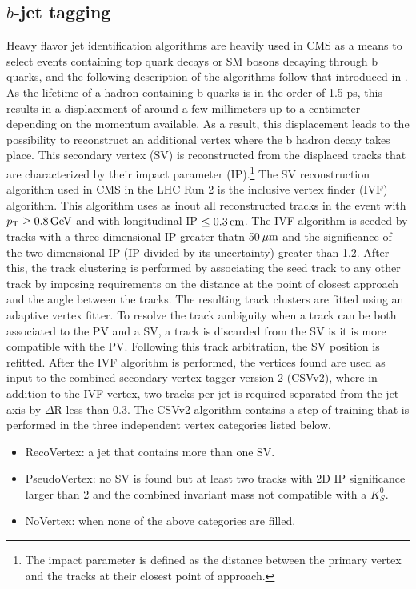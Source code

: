 \subsection*{$b$-jet tagging}\label{sec:objectsBJets}
\noindent\justify
Heavy flavor jet identification algorithms are heavily used in CMS as a means to select events containing top quark decays or SM bosons decaying through b quarks, and the following description of the algorithms follow that introduced in \cite{Sirunyan:2017ezt}. 
As the lifetime of a hadron containing b-quarks is in the order of 1.5 ps, this results in a displacement of around a few millimeters up to a centimeter depending on the momentum available. 
As a result, this displacement leads to the possibility to reconstruct an additional vertex where the b hadron decay takes place. 
This secondary vertex (SV) is reconstructed from the displaced tracks that are characterized by their impact parameter (IP).\footnote{The impact parameter is defined as the distance between the primary vertex and the tracks at their closest point of approach.}
The SV reconstruction algorithm used in CMS in the LHC Run 2 is the inclusive vertex finder (IVF) algorithm.
This algorithm uses as inout all reconstructed tracks in the event with $p_{\mathrm{T}}\geq0.8\,\text{Ge\hspace{-.08em}V}$ and with longitudinal IP $\leq0.3\,\text{cm}$. 
The IVF algorithm is seeded by tracks with a three dimensional IP greater thatn 50$\,\mu\text{m}$ and the significance of the two dimensional IP (IP divided by its uncertainty) greater than 1.2. 
After this, the track clustering is performed by associating the seed track to any other track by imposing requirements on the distance at the point of closest approach and the angle between the tracks. 
The resulting track clusters are fitted using an adaptive vertex fitter. 
To resolve the track ambiguity when a track can be both associated to the PV and a SV, a track is discarded from the SV is it is more compatible with the PV. 
Following this track arbitration, the SV position is refitted. 
After the IVF algorithm is performed, the vertices found are used as input to the combined secondary vertex tagger version 2 (CSVv2), where in addition to the IVF vertex, two tracks per jet is required separated from the jet axis by $\Delta$R less than 0.3. 
The CSVv2 algorithm contains a step of training that is performed in the three independent vertex categories listed below.
\begin{itemize}
\item RecoVertex: a jet that contains more than one SV.
\item PseudoVertex: no SV is found but at least two tracks with 2D IP significance larger than 2 and the combined invariant mass not compatible with a $K_{S}^{0}$. 
\item NoVertex: when none of the above categories are filled. 
\end{itemize}
